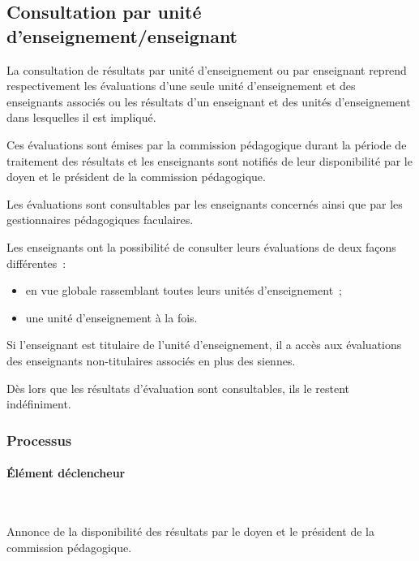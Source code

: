 \documentclass[a4paper,11pt]{report}
\begin{document}
\subsection{Consultation par unité d'enseignement/enseignant}\label{sec:consul-ue-enseign}

La consultation de résultats par unité d'enseignement ou par enseignant reprend respectivement les évaluations d'une seule unité d'enseignement et des enseignants associés ou les résultats d'un enseignant et des unités d'enseignement dans lesquelles il est impliqué.

Ces évaluations sont émises par la commission pédagogique durant la période de traitement des résultats et les enseignants sont notifiés de leur disponibilité par le doyen et le président de la commission pédagogique.

Les évaluations sont consultables par les enseignants concernés ainsi que par les gestionnaires pédagogiques faculaires.

Les enseignants ont la possibilité de consulter leurs évaluations de deux façons différentes~:
\begin{itemize}
	\item en vue globale rassemblant toutes leurs unités d'enseignement~;
	\item une unité d'enseignement à la fois.
\end{itemize}

Si l'enseignant est titulaire de l'unité d'enseignement, il a accès aux évaluations des enseignants non-titulaires associés en plus des siennes.

Dès lors que les résultats d'évaluation sont consultables, ils le restent indéfiniment.

\subsubsection{Processus}
\paragraph{Élément déclencheur}~\newline{}

Annonce de la disponibilité des résultats par le doyen et le président de la commission pédagogique.
\end{document}
